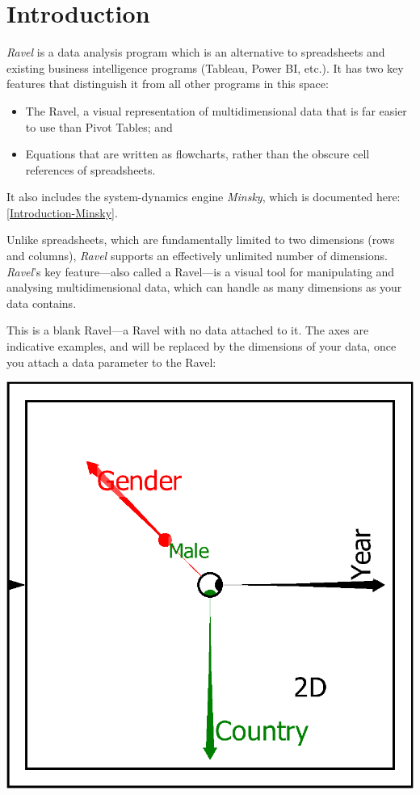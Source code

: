 
\chapter{Introduction}

\label{Introduction}\emph{Ravel} is a data analysis program which
is an alternative to spreadsheets and existing business intelligence
programs (Tableau, Power BI, etc.). It has two key features that distinguish
it from all other programs in this space: 
\begin{itemize}
\item The Ravel, a visual representation of multidimensional data that is
far easier to use than Pivot Tables; and
\item Equations that are written as flowcharts, rather than the obscure
cell references of spreadsheets.
\end{itemize}
It also includes the system-dynamics engine \emph{Minsky}, which is
documented here: \ref{Introduction-Minsky}.

Unlike spreadsheets, which are fundamentally limited to two dimensions
(rows and columns), \emph{Ravel} supports an effectively unlimited
number of dimensions. \emph{Ravel}'s key feature---also called a
Ravel---is a visual tool for manipulating and analysing multidimensional
data, which can handle as many dimensions as your data contains. 

This is a blank Ravel---a Ravel with no data attached to it. The
axes are indicative examples, and will be replaced by the dimensions
of your data, once you attach a data parameter to the Ravel:

\includegraphics{images/RavelBlank}

